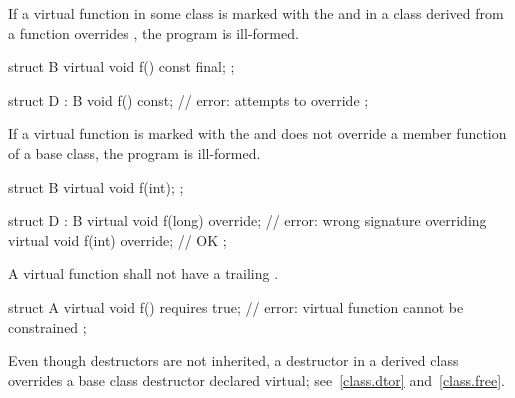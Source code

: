 \pnum
If a virtual function  in some class  is marked with the
  and in a class  derived from 
a function  overrides , the program is ill-formed. \begin{example}
\begin{codeblock}
struct B {
  virtual void f() const final;
};

struct D : B {
  void f() const;     // error:  attempts to override  
};
\end{codeblock}
\end{example}

\pnum
If a virtual function is marked with the   and
does not override a member function of a base class, the program is ill-formed. \begin{example}
\begin{codeblock}
struct B {
  virtual void f(int);
};

struct D : B {
  virtual void f(long) override;  // error: wrong signature overriding 
  virtual void f(int) override;   // OK
};
\end{codeblock}
\end{example}

\pnum
A virtual function shall not have a trailing .
\begin{example}
\begin{codeblock}
struct A {
  virtual void f() requires true; // error: virtual function cannot be constrained
};
\end{codeblock}
\end{example}

\pnum
Even though destructors are not inherited, a destructor in a derived
class overrides a base class destructor declared virtual;
see~\ref{class.dtor} and~\ref{class.free}.

